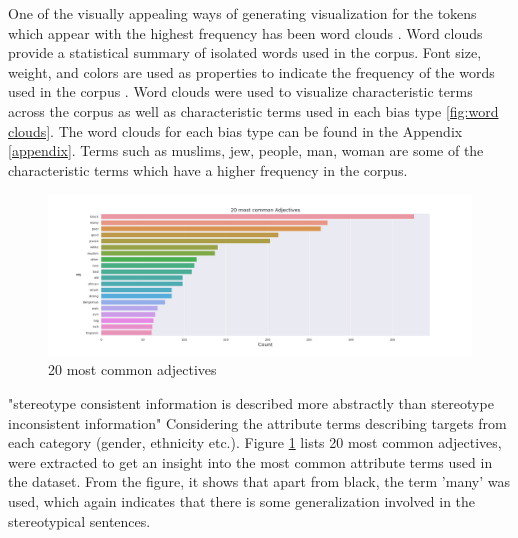 One of the visually appealing ways of generating visualization for the tokens which appear with the highest frequency has been word clouds \cite{heimerl2014word}. Word clouds provide a statistical summary of isolated words used in the corpus. Font size, weight, and colors are used as properties to indicate the frequency of the words used in the corpus \cite{heimerl2014word}. Word clouds were used to visualize characteristic terms across the corpus as well as characteristic terms used in each bias type \ref{fig:word clouds}. The word clouds for each bias type can be found in the Appendix \ref{appendix}. Terms such as muslims, jew, people, man, woman are some of the characteristic terms which have a higher frequency in the corpus.  

\begin{figure}[]
    \centering
    \includegraphics[width=1\columnwidth]{thesis/figures/20 most common Adjectives.png}
    \caption{20 most common adjectives}
    \label{fig:Common_adj}
\end{figure}

"stereotype consistent information is described more abstractly than stereotype inconsistent information" \cite{wigboldus2005we} Considering the attribute terms describing targets from each category (gender, ethnicity etc.).  Figure \ref{fig:Common_adj} lists 20 most common adjectives, were extracted to get an insight into the most common attribute terms used in the dataset. From the figure, it shows that apart from black, the term 'many' was used, which again indicates that there is some generalization involved in the stereotypical sentences.  


